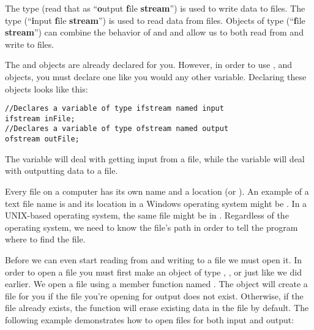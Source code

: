 The  type (read that as ``\textbf{o}utput \textbf{f}ile \textbf{stream}'') is used to write data to files. 
The  type (``\textbf{i}nput \textbf{f}ile \textbf{stream}'') is used to read data from files. 
Objects of type  (``\textbf{f}ile \textbf{stream}'') can combine the behavior of  and  and allow us to both read from and write to files.

The  and  objects are already declared for you. 
However, in order to use ,  and  objects, you must declare one like you would any other variable. 
Declaring these objects looks like this:

\noindent\begin{minipage}{\linewidth}\begin{lstlisting}
//Declares a variable of type ifstream named input
ifstream inFile; 
//Declares a variable of type ofstream named output
ofstream outFile; 
\end{lstlisting}\end{minipage}

The variable  will deal with getting input from a file, while the variable  will deal with outputting data to a file. 

Every file on a computer has its own name and a location (or ).
An example of a text file name is  and its location in a Windows operating system might be . 
In a UNIX-based operating system, the same file might be in . 
Regardless of the operating system, we need to know the file's path in order to tell the program where to find the file. 


Before we can even start reading from and writing to a file we must open it. 
In order to open a file you must first make an object of type , , or  just like we did earlier. 
We open a file using a member function named . 
The  object will create a file for you if the file you're opening for output does not exist.
Otherwise, if the file already exists, the  function will erase existing data in the file by default. 
The following example demonstrates how to open files for both input and output:

